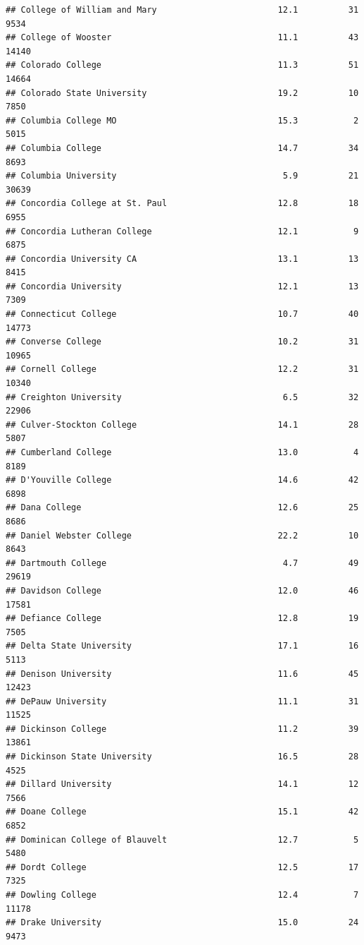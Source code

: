 \documentclass[
]{article}
\begin{document}
\begin{verbatim}
## College of William and Mary                        12.1          31   9534
## College of Wooster                                 11.1          43  14140
## Colorado College                                   11.3          51  14664
## Colorado State University                          19.2          10   7850
## Columbia College MO                                15.3           2   5015
## Columbia College                                   14.7          34   8693
## Columbia University                                 5.9          21  30639
## Concordia College at St. Paul                      12.8          18   6955
## Concordia Lutheran College                         12.1           9   6875
## Concordia University CA                            13.1          13   8415
## Concordia University                               12.1          13   7309
## Connecticut College                                10.7          40  14773
## Converse College                                   10.2          31  10965
## Cornell College                                    12.2          31  10340
## Creighton University                                6.5          32  22906
## Culver-Stockton College                            14.1          28   5807
## Cumberland College                                 13.0           4   8189
## D'Youville College                                 14.6          42   6898
## Dana College                                       12.6          25   8686
## Daniel Webster College                             22.2          10   8643
## Dartmouth College                                   4.7          49  29619
## Davidson College                                   12.0          46  17581
## Defiance College                                   12.8          19   7505
## Delta State University                             17.1          16   5113
## Denison University                                 11.6          45  12423
## DePauw University                                  11.1          31  11525
## Dickinson College                                  11.2          39  13861
## Dickinson State University                         16.5          28   4525
## Dillard University                                 14.1          12   7566
## Doane College                                      15.1          42   6852
## Dominican College of Blauvelt                      12.7           5   5480
## Dordt College                                      12.5          17   7325
## Dowling College                                    12.4           7  11178
## Drake University                                   15.0          24   9473

\end{verbatim}
\end{document}
